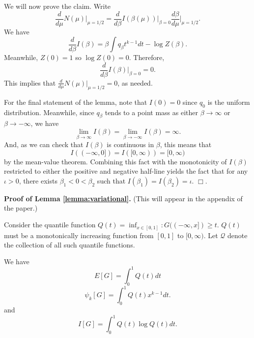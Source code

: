 \documentclass[12pt]{article}
\begin{document}
We will now prove the claim.  Write
\[
\frac{d}{d\mu} N(\mu)\bigg|_{\mu = 1/2} = \frac{d}{d\beta} I(\beta(\mu)) \bigg|_{\beta = 0} \frac{d\beta}{d\mu} \bigg|_{\mu = 1/2}.
\]
We have
\[
\frac{d}{d\beta} I(\beta) = \beta \int q_\beta t^{k-1} dt - \log Z(\beta).
\]
Meanwhile, $Z(0) = 1$ so $\log Z(0) = 0$.  Therefore,
\[
\frac{d}{d\beta} I(\beta) \bigg|_{\beta = 0} = 0.
\]
This implies that $\frac{d}{d\mu} N(\mu) |_{\mu = 1/2} = 0$, as needed.  

For the final statement of the lemma, note that $I(0) = 0$ since $q_0$ is the uniform distribution.
Meanwhile, since $q_\beta$ tends to a point mass as either $\beta \to \infty$ or $\beta \to -\infty$,
we have 
\[
\lim_{\beta \to \infty} I(\beta) = \lim_{\beta \to -\infty} I(\beta) = \infty.
\]
And, as we can check that $I(\beta)$ is continuous in $\beta$, this means that
\[
I((-\infty, 0]) = I([0,\infty)) = [0, \infty)
\]
by the mean-value theorem.  Combining this fact with the monotonicity
of $I(\beta)$ restricted to either the positive and negative half-line
yields the fact that for any $\iota > 0$, there exists $\beta_1 < 0
< \beta_2$ such that $I(\beta_1) = I(\beta_2) = \iota$.  $\Box$.

\textbf{Proof of Lemma \ref{lemma:variational}.} (This will appear in the appendix of the paper.)

Consider the quantile function $Q(t) = \inf_{x \in [0,1]}: G((-\infty,
x]) \geq t.$ $Q(t)$ must be a monotonically increasing function from
$[0,1]$ to $[0,\infty).$ Let $\mathcal{Q}$ denote the collection of
all such quantile functions.

We have
\[
E[G] = \int_0^1 Q(t) dt
\]
\[
\psi_k[G] = \int_0^1 Q(t) x^{k-1} dt.
\]
and
\[
I[G] = \int_0^1 Q(t) \log Q(t) dt.
\]
\end{document}
